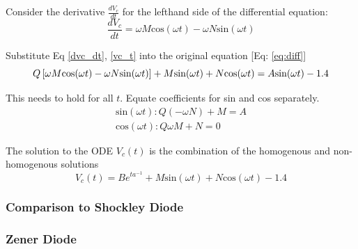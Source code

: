 Consider the derivative $\frac{dV_c}{dt}$ for the lefthand side of the differential equation:
\begin{equation}
	\frac{dV_c}{dt} = \omega M\text{cos}(\omega t) - \omega N\text{sin}(\omega t)
	\label{dvc_dt}
\end{equation}

Substitute Eq \ref{dvc_dt}, \ref{vc_t} into the original equation [Eq: \ref{eq:diff}]
\begin{equation}
	Q\left[\omega M\text{cos}(\omega t) - \omega N\text{sin}(\omega t) \right] + M\text{sin}(\omega t) + N\text{cos}(\omega t) = A\text{sin}(\omega t) - 1.4
\end{equation}

This needs to hold for all $t$. Equate coefficients for sin and cos separately. 
\begin{equation}
	\begin{split}
		\text{sin}(\omega t): Q(-\omega N) + M = A \\
		\text{cos}(\omega t): Q\omega M + N = 0
	\end{split}
\end{equation}

The solution to the ODE $V_c(t)$ is the combination of the homogenous and non-homogenous solutions
\begin{equation}
	V_c(t) = Be^{ta^{-1}} + M\text{sin}(\omega t) + N\text{cos}(\omega t) - 1.4
\end{equation}

%
%

\subsubsection{Comparison to Shockley Diode}

\subsubsection{Zener Diode}
